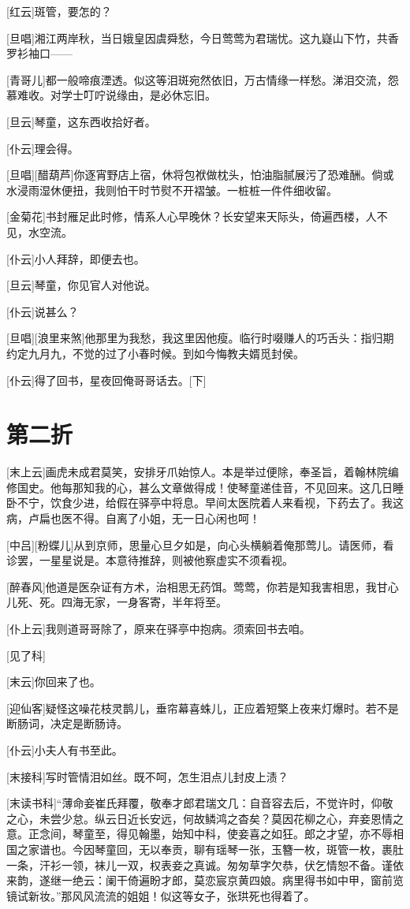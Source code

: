 \documentclass{book}
\newcommand\nchapter[1]{\chapter*{#1}\markboth{#1}{}\addcontentsline{toc}{chapter}{#1}}
\begin{document}
[红云]斑管，要怎的？

[旦唱]湘江两岸秋，当日娥皇因虞舜愁，今日莺莺为君瑞忧。这九嶷山下竹，共香罗衫袖口——

[青哥儿]都一般啼痕湮透。似这等泪斑宛然依旧，万古情缘一样愁。涕泪交流，怨慕难收。对学士叮咛说缘由，是必休忘旧。

[旦云]琴童，这东西收拾好者。

[仆云]理会得。

[旦唱][醋葫芦]你逐宵野店上宿，休将包袱做枕头，怕油脂腻展污了恐难酬。倘或水浸雨湿休便扭，我则怕干时节熨不开褶皱。一桩桩一件件细收留。

[金菊花]书封雁足此时修，情系人心早晚休？长安望来天际头，倚遍西楼，人不见，水空流。

[仆云]小人拜辞，即便去也。

[旦云]琴童，你见官人对他说。

[仆云]说甚么？

[旦唱][浪里来煞]他那里为我愁，我这里因他瘦。临行时啜赚人的巧舌头：指归期约定九月九，不觉的过了小春时候。到如今悔教夫婿觅封侯。

[仆云]得了回书，星夜回俺哥哥话去。[下]

\nchapter{第二折}

[末上云]画虎未成君莫笑，安排牙爪始惊人。本是举过便除，奉圣旨，着翰林院编修国史。他每那知我的心，甚么文章做得成！使琴童递佳音，不见回来。这几日睡卧不宁，饮食少进，给假在驿亭中将息。早间太医院着人来看视，下药去了。我这病，卢扁也医不得。自离了小姐，无一日心闲也呵！

[中吕][粉蝶儿]从到京师，思量心旦夕如是，向心头横躺着俺那莺儿。请医师，看诊罢，一星星说是。本意待推辞，则被他察虚实不须看视。

[醉春风]他道是医杂证有方术，治相思无药饵。莺莺，你若是知我害相思，我甘心儿死、死。四海无家，一身客寄，半年将至。

[仆上云]我则道哥哥除了，原来在驿亭中抱病。须索回书去咱。

[见了科]

[末云]你回来了也。

[迎仙客]疑怪这噪花枝灵鹊儿，垂帘幕喜蛛儿，正应着短檠上夜来灯爆时。若不是断肠词，决定是断肠诗。

[仆云]小夫人有书至此。

[末接科]写时管情泪如丝。既不呵，怎生泪点儿封皮上渍？

[末读书科]``薄命妾崔氏拜覆，敬奉才郎君瑞文几：自音容去后，不觉许时，仰敬之心，未尝少怠。纵云日近长安远，何故鳞鸿之杳矣？莫因花柳之心，弃妾恩情之意。正念间，琴童至，得见翰墨，始知中科，使妾喜之如狂。郎之才望，亦不辱相国之家谱也。今因琴童回，无以奉贡，聊有瑶琴一张，玉簪一枚，斑管一枚，裹肚一条，汗衫一领，袜儿一双，权表妾之真诚。匆匆草字欠恭，伏乞情恕不备。谨依来韵，遂继一绝云：阑干倚遍盼才郎，莫恋宸京黄四娘。病里得书如中甲，窗前览镜试新妆。''那风风流流的姐姐！似这等女子，张珙死也得着了。
\end{document}
